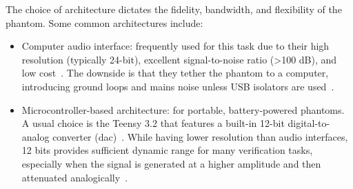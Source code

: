 The choice of architecture dictates the fidelity, bandwidth, and flexibility of the phantom. Some common architectures include:

\begin{itemize}
    \item Computer audio interface: frequently used for this task due to their high resolution (typically 24-bit), excellent signal-to-noise ratio (>100 dB), and low cost~\cite{Collier2012}. The downside is that they tether the phantom to a computer, introducing ground loops and mains noise unless USB isolators are used~\cite{LEAHY1998159}.
    \item Microcontroller-based architecture: for portable, battery-powered phantoms. A usual choice is the Teensy 3.2 that features a built-in 12-bit digital-to-analog converter (\gls{dac})~\cite{PJRC_Teensy}. While having lower resolution than audio interfaces, 12 bits provides sufficient dynamic range for many verification tasks, especially when the signal is generated at a higher amplitude and then attenuated analogically~\cite{LEAHY1998159}.
\end{itemize}
